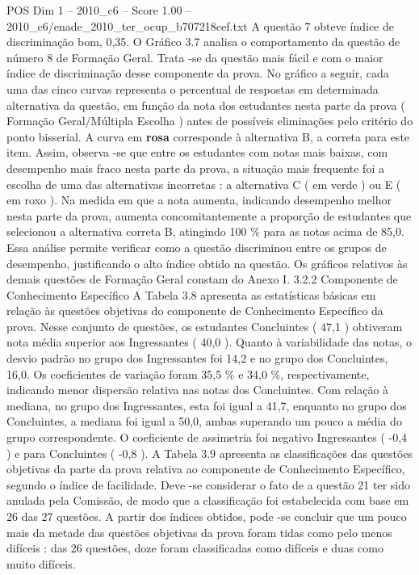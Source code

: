 \begin{textsample}{POS Dim 1 – 2010\_c6 – Score 1.00 – 2010\_c6/enade\_2010\_ter\_ocup\_b707218cef.txt}
A questão 7 obteve índice de discriminação bom, 0,35.
O Gráfico 3.7 analisa o comportamento da questão de número 8 de Formação Geral.
Trata -se da questão mais fácil e com o maior índice de discriminação desse componente da prova.
No gráfico a seguir, cada uma das cinco curvas representa o percentual de respostas em determinada alternativa da questão, em função da nota dos estudantes nesta parte da prova ( Formação Geral/Múltipla Escolha ) antes de possíveis eliminações pelo critério do ponto bisserial.
A curva em \textbf{rosa} corresponde à alternativa B, a correta para este item.
Assim, observa -se que entre os estudantes com notas mais baixas, com desempenho mais fraco nesta parte da prova, a situação mais frequente foi a escolha de uma das alternativas incorretas : a alternativa C ( em verde ) ou E ( em roxo ).
Na medida em que a nota aumenta, indicando desempenho melhor nesta parte da prova, aumenta concomitantemente a proporção de estudantes que selecionou a alternativa correta B, atingindo 100 \% para as notas acima de 85,0.
Essa análise permite verificar como a questão discriminou entre os grupos de desempenho, justificando o alto índice obtido na questão.
Os gráficos relativos às demais questões de Formação Geral constam do Anexo I. 3.2.2 Componente de Conhecimento Específico A Tabela 3.8 apresenta as estatísticas básicas em relação às questões objetivas do componente de Conhecimento Específico da prova.
Nesse conjunto de questões, os estudantes Concluintes ( 47,1 ) obtiveram nota média superior aos Ingressantes ( 40,0 ).
Quanto à variabilidade das notas, o desvio padrão no grupo dos Ingressantes foi 14,2 e no grupo dos Concluintes, 16,0.
Os coeficientes de variação foram 35,5 \% e 34,0 \%, respectivamente, indicando menor dispersão relativa nas notas dos Concluintes.
Com relação à mediana, no grupo dos Ingressantes, esta foi igual a 41,7, enquanto no grupo dos Concluintes, a mediana foi igual a 50,0, ambas superando um pouco a média do grupo correspondente.
O coeficiente de assimetria foi negativo Ingressantes ( -0,4 ) e para Concluintes ( -0,8 ).
A Tabela 3.9 apresenta as classificações das questões objetivas da parte da prova relativa ao componente de Conhecimento Específico, segundo o índice de facilidade.
Deve -se considerar o fato de a questão 21 ter sido anulada pela Comissão, de modo que a classificação foi estabelecida com base em 26 das 27 questões.
A partir dos índices obtidos, pode -se concluir que um pouco mais da metade das questões objetivas da prova foram tidas como pelo menos difíceis : das 26 questões, doze foram classificadas como difíceis e duas como muito difíceis.

\end{textsample}

